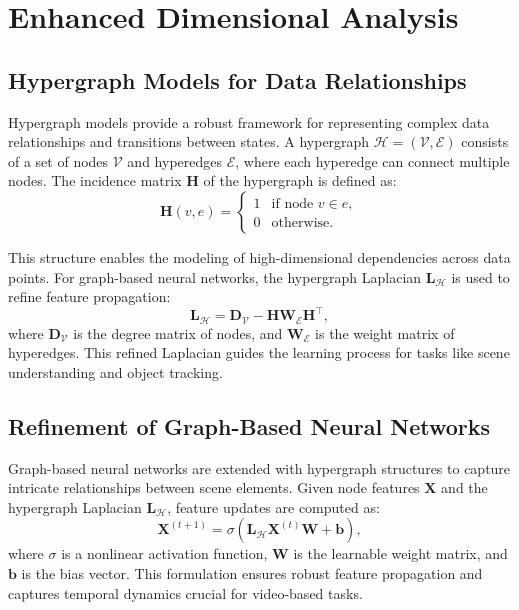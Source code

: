\documentclass{article}
\theoremstyle{plain}
\begin{document}
\section{Enhanced Dimensional Analysis}

\subsection{Hypergraph Models for Data Relationships}
Hypergraph models provide a robust framework for representing complex data relationships and transitions between states. A hypergraph \( \mathcal{H} = (\mathcal{V}, \mathcal{E}) \) consists of a set of nodes \( \mathcal{V} \) and hyperedges \( \mathcal{E} \), where each hyperedge can connect multiple nodes. The incidence matrix \( \mathbf{H} \) of the hypergraph is defined as:
\begin{equation}
\mathbf{H}(v, e) =
\begin{cases} 
1 & \text{if node } v \in e, \\
0 & \text{otherwise}.
\end{cases}
\end{equation}

This structure enables the modeling of high-dimensional dependencies across data points. For graph-based neural networks, the hypergraph Laplacian \( \mathbf{L}_\mathcal{H} \) is used to refine feature propagation:
\begin{equation}
\mathbf{L}_\mathcal{H} = \mathbf{D}_\mathcal{V} - \mathbf{H} \mathbf{W}_\mathcal{E} \mathbf{H}^\top,
\end{equation}
where \( \mathbf{D}_\mathcal{V} \) is the degree matrix of nodes, and \( \mathbf{W}_\mathcal{E} \) is the weight matrix of hyperedges. This refined Laplacian guides the learning process for tasks like scene understanding and object tracking.

\subsection{Refinement of Graph-Based Neural Networks}
Graph-based neural networks are extended with hypergraph structures to capture intricate relationships between scene elements. Given node features \( \mathbf{X} \) and the hypergraph Laplacian \( \mathbf{L}_\mathcal{H} \), feature updates are computed as:
\begin{equation}
\mathbf{X}^{(t+1)} = \sigma \left( \mathbf{L}_\mathcal{H} \mathbf{X}^{(t)} \mathbf{W} + \mathbf{b} \right),
\end{equation}
where \( \sigma \) is a nonlinear activation function, \( \mathbf{W} \) is the learnable weight matrix, and \( \mathbf{b} \) is the bias vector. This formulation ensures robust feature propagation and captures temporal dynamics crucial for video-based tasks.
\end{document}
